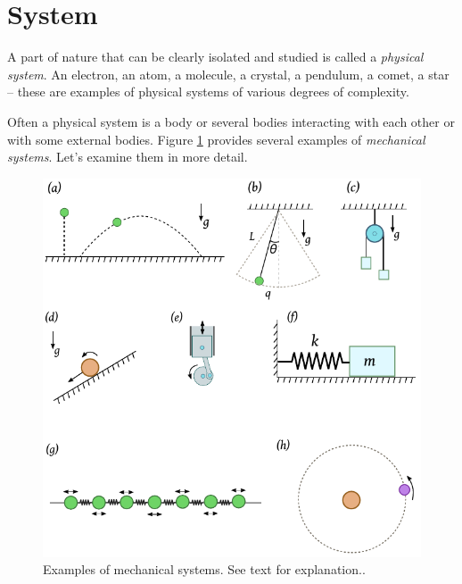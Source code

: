 \section{System}\label{sec:System}
A part of nature that can be clearly isolated and studied is called a \emph{physical system}. An electron, an atom, a molecule, a crystal, a pendulum, a comet, a star – these are examples of physical systems of various degrees of complexity.

Often a physical system is a body or several bodies interacting with each other or with some external bodies. Figure \ref{fig:systemExamples} provides several examples of \emph{mechanical systems}. Let’s examine them in more detail.
\begin{figure}[htbp]
	\centering
	\includegraphics[scale=1.0]{systemExamples}
	\caption{Examples of mechanical systems. See text for explanation..}
	\label{fig:systemExamples}
\end{figure}
\renewcommand{\labelenumi}{(\alph{enumi})}
